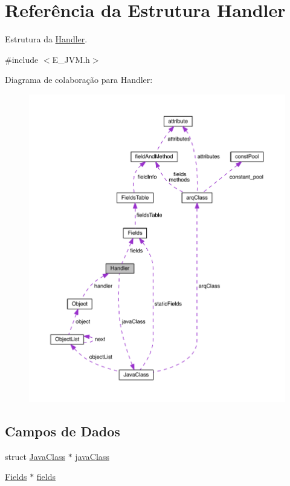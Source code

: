 \hypertarget{struct_handler}{}\section{Referência da Estrutura Handler}
\label{struct_handler}


Estrutura da \hyperlink{struct_handler}{Handler}.  




{\ttfamily \#include $<$E\+\_\+\+J\+V\+M.\+h$>$}



Diagrama de colaboração para Handler\+:\nopagebreak
\begin{figure}[H]
\begin{center}
\leavevmode
\includegraphics[width=350pt]{struct_handler__coll__graph}
\end{center}
\end{figure}
\subsection*{Campos de Dados}
\begin{DoxyCompactItemize}
\item 
struct \hyperlink{struct_java_class}{Java\+Class} $\ast$ \hyperlink{struct_handler_a0d23c9897e6fa7293405ac2ba8321efb}{java\+Class}
\item 
\hyperlink{struct_fields}{Fields} $\ast$ \hyperlink{struct_handler_ab880a8f45a9b1c69a21372e72f407028}{fields}
\end{DoxyCompactItemize}


